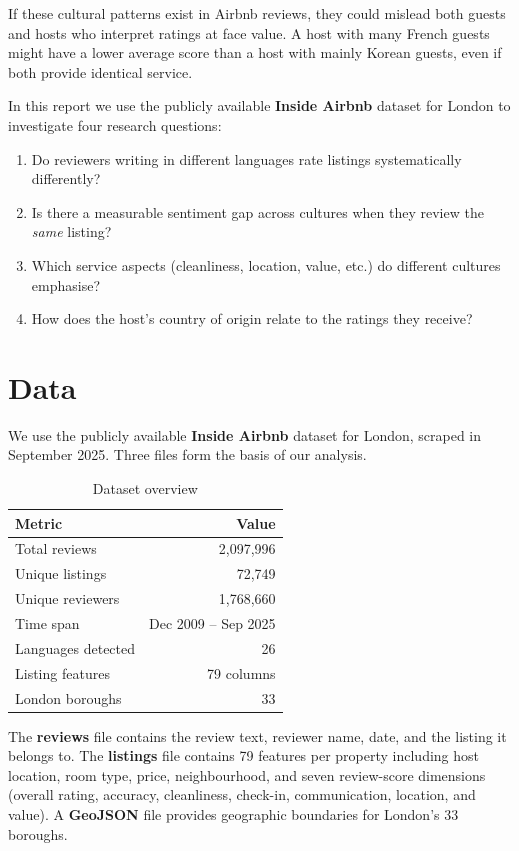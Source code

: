 \documentclass[12pt,a4paper]{article}
\begin{document}
If these cultural patterns exist in Airbnb reviews, they could mislead both guests and hosts who interpret ratings at face value.
A host with many French guests might have a lower average score than a host with mainly Korean guests, even if both provide identical service.

In this report we use the publicly available \textbf{Inside Airbnb} dataset for London to investigate four research questions:
\begin{enumerate}[nosep]
    \item Do reviewers writing in different languages rate listings systematically differently?
    \item Is there a measurable sentiment gap across cultures when they review the \emph{same} listing?
    \item Which service aspects (cleanliness, location, value, etc.) do different cultures emphasise?
    \item How does the host's country of origin relate to the ratings they receive?
\end{enumerate}

\section{Data}

We use the publicly available \textbf{Inside Airbnb} dataset for London, scraped in September 2025.
Three files form the basis of our analysis.

\begin{table}[H]
\centering
\caption{Dataset overview}
\begin{tabular}{lr}
\toprule
\textbf{Metric} & \textbf{Value} \\
\midrule
Total reviews           & 2,097,996 \\
Unique listings         & 72,749 \\
Unique reviewers        & 1,768,660 \\
Time span               & Dec 2009 -- Sep 2025 \\
Languages detected      & 26 \\
Listing features        & 79 columns \\
London boroughs         & 33 \\
\bottomrule
\end{tabular}
\end{table}

The \textbf{reviews} file contains the review text, reviewer name, date, and the listing it belongs to.
The \textbf{listings} file contains 79 features per property including host location, room type, price, neighbourhood, and seven review-score dimensions (overall rating, accuracy, cleanliness, check-in, communication, location, and value).
A \textbf{GeoJSON} file provides geographic boundaries for London's 33 boroughs.
\end{document}
